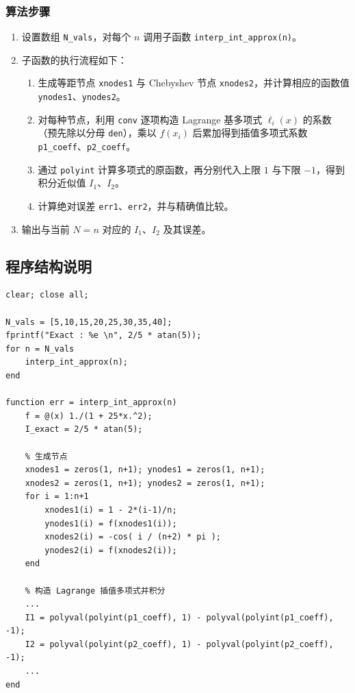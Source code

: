 \documentclass[12pt,a4paper]{article}
\begin{document}
\subsubsection{算法步骤}
\begin{enumerate}
    \item 设置数组 \texttt{N\_vals}，对每个 \(n\) 调用子函数 \texttt{interp\_int\_approx(n)}。
    \item 子函数的执行流程如下：
    \begin{enumerate}
        \item 生成等距节点 \texttt{xnodes1} 与 Chebyshev 节点 \texttt{xnodes2}，并计算相应的函数值 \texttt{ynodes1}、\texttt{ynodes2}。
        \item 对每种节点，利用 \texttt{conv} 逐项构造 Lagrange 基多项式 \(\ell_i(x)\) 的系数（预先除以分母 \texttt{den}），乘以 \(f(x_i)\) 后累加得到插值多项式系数 \texttt{p1\_coeff}、\texttt{p2\_coeff}。
        \item 通过 \texttt{polyint} 计算多项式的原函数，再分别代入上限 \(1\) 与下限 \(-1\)，得到积分近似值 \(I_1\)、\(I_2\)。
        \item 计算绝对误差 \texttt{err1}、\texttt{err2}，并与精确值比较。
    \end{enumerate}
    \item 输出与当前 \(N=n\) 对应的 \(I_1\)、\(I_2\) 及其误差。
\end{enumerate}

\subsection{程序结构说明}

\begin{lstlisting}[caption={hw7\_1.m 程序结构}, label={lst:hw7code}]
clear; close all;

N_vals = [5,10,15,20,25,30,35,40];
fprintf("Exact : %e \n", 2/5 * atan(5));
for n = N_vals
    interp_int_approx(n);
end

function err = interp_int_approx(n)
    f = @(x) 1./(1 + 25*x.^2);
    I_exact = 2/5 * atan(5);

    % 生成节点
    xnodes1 = zeros(1, n+1); ynodes1 = zeros(1, n+1);
    xnodes2 = zeros(1, n+1); ynodes2 = zeros(1, n+1);
    for i = 1:n+1
        xnodes1(i) = 1 - 2*(i-1)/n;
        ynodes1(i) = f(xnodes1(i));
        xnodes2(i) = -cos( i / (n+2) * pi );
        ynodes2(i) = f(xnodes2(i));
    end

    % 构造 Lagrange 插值多项式并积分
    ...
    I1 = polyval(polyint(p1_coeff), 1) - polyval(polyint(p1_coeff), -1);
    I2 = polyval(polyint(p2_coeff), 1) - polyval(polyint(p2_coeff), -1);
    ...
end
\end{lstlisting}
\end{document}
